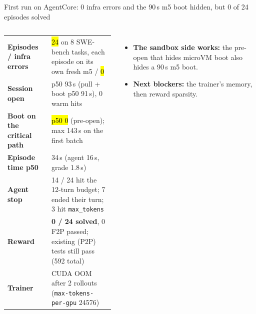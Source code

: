 \begin{frame}{First run on AgentCore: 0 infra errors and the 90\,s m5 boot hidden, but 0 of 24 episodes solved}
\begin{columns}[T]
\scriptsize
\begin{tabularx}{\linewidth}{@{}>{\bfseries}p{2.5cm}X@{}}
\toprule
Episodes / infra errors & \hl{24} on 8 SWE-bench tasks, each episode on its own fresh m5 / \hl{0}\\
Session open & p50 93\,s (pull + boot p50 91\,s), 0 warm hits\\
Boot on the critical path & \hl{p50 0} (pre-open); max 143\,s on the first batch\\
Episode time p50 & 34\,s (agent 16\,s, grade 1.8\,s)\\
Agent stop & 14 / 24 hit the 12-turn budget; 7 ended their turn; 3 hit \texttt{max\_tokens}\\
Reward & \textbf{0 / 24 solved}, 0 F2P passed; existing (P2P) tests still pass (592 total)\\
Trainer & CUDA OOM after 2 rollouts (\texttt{max-tokens-per-gpu} 24576)\\
\bottomrule
\end{tabularx}
\begin{itemize}\footnotesize\setlength{\itemsep}{1.5mm}
\item \textbf{The sandbox side works:} the pre-open that hides microVM boot also hides a 90\,s m5 boot.
\item \textbf{Next blockers:} the trainer's memory, then reward sparsity.
\end{itemize}
\end{columns}
\end{frame}


